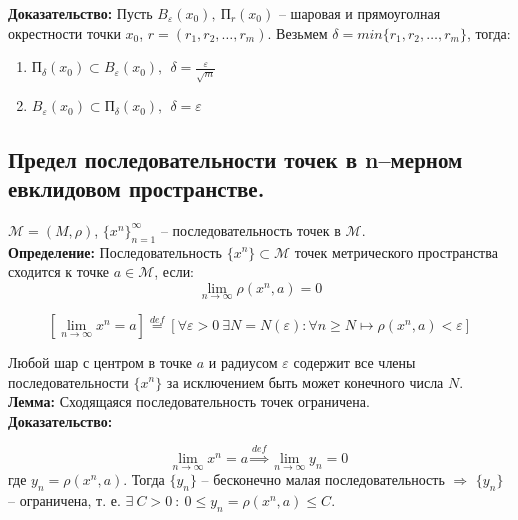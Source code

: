 \documentclass[a4paper,12pt]{article} %
\begin{document}
\noindent \textbf{Доказательство:} Пусть $B_{\varepsilon}(x_0), ~ \text{П}_{r}(x_0)$ -- шаровая и прямоуголная окрестности точки $x_0$, $r = (r_1, r_2, \dots, r_m)$. Везьмем $\delta = min\{r_1, r_2, \dots, r_m \}$, тогда:

\begin{enumerate}
    \item $\text{П}_{\delta}(x_0) \subset B_{\varepsilon}(x_0), ~~ \delta = \frac{\varepsilon}{\sqrt{m}}$
    \item $B_{\varepsilon}(x_0) \subset \text{П}_{\delta}(x_0), ~~ \delta = \varepsilon$
\end{enumerate}

\subsection*{Предел последовательности точек в n–мерном евклидовом пространстве.}

\noindent $\mathscr{M} = (M, \rho)$, $\{x^n \}_{n = 1}^{\infty}$ -- последовательность точек в $\mathscr{M}$.\\[0.5 cm]

\noindent \textbf{Определение:} Последовательность $\{x^n \} \subset \mathscr{M}$ точек метрического пространства сходится к точке $a \in \mathscr{M}$, если:
\begin{equation*}
    \lim_{n \to \infty} \rho(x^n, a) = 0
\end{equation*}

\[ [\lim_{n \to \infty} x^n = a] \stackrel{def}{=} [\forall \varepsilon > 0 ~ \exists N = N(\varepsilon) : \forall n \geqslant N \mapsto \rho(x^n, a) < \varepsilon] \]

\noindent Любой шар с центром в точке $a$ и радиусом $\varepsilon$ содержит все члены последовательности $\{x^n \}$ за исключением быть может конечного числа $N$.\\

\noindent \textbf{Лемма:} Сходящаяся последовательность точек ограничена.\\

\noindent \textbf{Доказательство:}

\[ \lim_{n \to \infty} x^n = a \stackrel{def}{\Rightarrow} \lim_{n \to \infty} y_n = 0 \
\]
\noindent где $y_n = \rho(x^n, a)$. Тогда $\{y_n \}$ -- бесконечно малая последовательность $\Rightarrow$ $\{y_n \}$ -- ограничена, т. е. $\exists ~ C > 0 ~ : ~ 0 \leqslant y_n = \rho(x^n, a) \leqslant C$.\\
\end{document}
